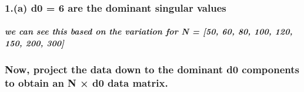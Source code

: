 \documentclass[11pt]{article}
\begin{document}
    \begin{center}
    \end{center}
    { \hspace*{\fill} \\}
    
    \subsubsection{1.(a) d0 = 6 are the dominant singular
values}\label{a-d0-6-are-the-dominant-singular-values}

\subparagraph{we can see this based on the variation for N = {[}50, 60,
80, 100, 120, 150, 200,
300{]}}\label{we-can-see-this-based-on-the-variation-for-n-50-60-80-100-120-150-200-300}

\subsubsection{Now, project the data down to the dominant d0 components
to obtain an N × d0 data
matrix.}\label{now-project-the-data-down-to-the-dominant-d0-components-to-obtain-an-n-d0-data-matrix.}
\end{document}

